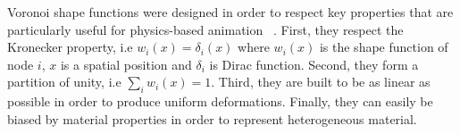 Voronoi shape functions were designed in order to respect key properties that are particularly useful for physics-based animation~\cite{Faure2011} . First, they respect the Kronecker property, i.e $w_{i}(x) = \delta_{i}(x)$ where $w_{i}(x)$ is the shape function of node $i$, $x$ is a spatial position and $\delta_{i}$ is Dirac function. Second, they form a partition of unity, i.e $\sum_{i}w_{i}(x) = 1$. Third, they are built to be as linear as possible in order to produce uniform deformations. Finally, they can easily be biased by material properties in order to represent heterogeneous material.

